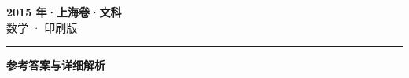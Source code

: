 \documentclass[zihao=5, a4paper]{ctexart}
\begin{document}
\begin{center}
  {\Large\bfseries 2015 年·上海卷·文科}\\[4pt]
  {\large 数学 · 印刷版}
\end{center}
\medskip
{}

\par\bigskip\hrule\bigskip
{}
\begin{center}{\large\bfseries 参考答案与详细解析}\end{center}
\smallskip

\end{document}
